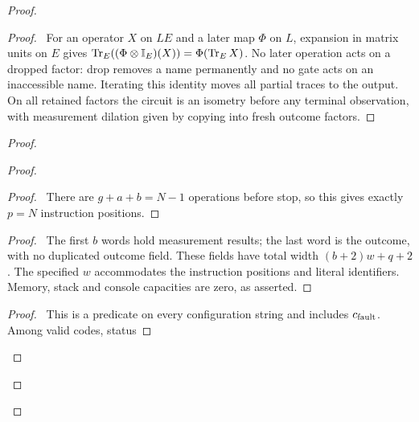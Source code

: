 \begin{proof}
 \begin{proof}\pf\ For an operator $X$ on $LE$ and a later map
 $\Phi$ on $L$, expansion in matrix units on $E$ gives
 $\operatorname{Tr}_E((\Phi\otimes\mathbb{I}_E)(X))=\Phi(\operatorname{Tr}_E X)$.
 No later operation acts on a dropped factor: drop removes a name permanently and no gate acts on an inaccessible name.
Iterating this identity moves all partial traces to the output.
 On all retained factors the circuit is an isometry before any
 terminal observation, with measurement dilation given by copying
 into fresh outcome factors.\end{proof}
\begin{proof}
 \begin{proof}
  \begin{proof}\pf\ There are $g+a+b=N-1$ operations before stop,
  so this gives exactly $p=N$ instruction positions.\end{proof}
  \begin{proof}\pf\ The first $b$ words hold measurement results;
  the last word is the outcome, with no duplicated outcome field.
  These fields have total width $(b+2)w+q+2$. The specified $w$
  accommodates the instruction positions and literal identifiers.
  Memory, stack and console capacities are zero, as asserted.\end{proof}
  \begin{proof}\pf\ This is a predicate on every configuration
  string and includes $c_{\rm fault}$. Among valid codes, status

\end{proof}
\end{proof}
\end{proof}
\end{proof}
